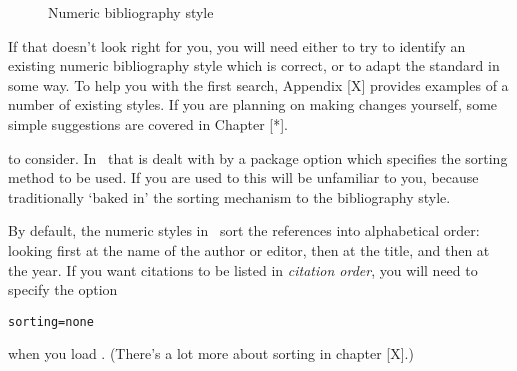 \begin{figure}
\caption{Numeric bibliography style\label{numeric-examples}}
\end{figure}

If that doesn't look right for you, you will need either to try to
identify an existing numeric bibliography style which is correct, or
to adapt the standard in some way. To help you with the first search,
Appendix [X] provides examples of a number of existing styles. If you
are planning on making changes yourself, some simple suggestions are
covered in Chapter [*].

 to consider. In \biblatex\ that
is dealt with by a package option which specifies the sorting method
to be used. If you are used to  this will be
unfamiliar to you, because traditionally  `baked in'
the sorting mechanism to the bibliography style.

By default, the numeric styles in \biblatex\ sort the references into
alphabetical order: looking first at the name of the author or editor,
then at the title, and then at the year. If you want citations to be
listed in \emph{citation order}, you will need to specify the option
\begin{center}
\verb|sorting=none|
\end{center}

when you load \biblatex. (There's a lot more about sorting in chapter
[X].)


